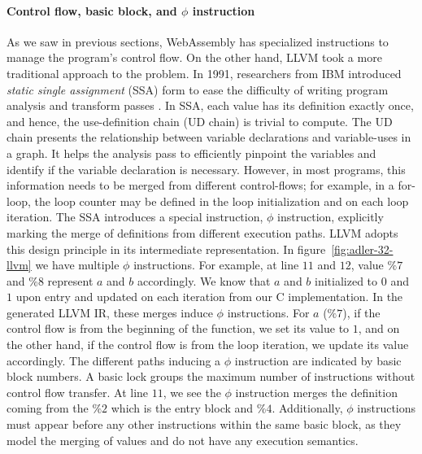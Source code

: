 \paragraph{Control flow, basic block, and $\phi$ instruction}
As we saw in previous sections, WebAssembly has specialized instructions to
manage the program's control flow. On the other hand, LLVM took a more
traditional approach to the problem. In 1991, researchers from IBM introduced
\emph{static single assignment} (SSA) form to ease the difficulty of writing
program analysis and transform passes \cite{ibm-ssa}. In SSA, each value has its
definition exactly once, and hence, the use-definition chain (UD chain) is
trivial to compute. The UD chain presents the relationship between variable
declarations and variable-uses in a graph. It helps the analysis pass to
efficiently pinpoint the variables and identify if the variable declaration is
necessary. However, in most programs, this information needs to be merged from
different control-flows; for example, in a for-loop, the loop counter may be
defined in the loop initialization and on each loop iteration. The SSA
introduces a special instruction, $\phi$ instruction, explicitly marking the
merge of definitions from different execution paths. LLVM adopts this design
principle in its intermediate representation. In figure~\ref{fig:adler-32-llvm}
we have multiple $\phi$ instructions. For example, at line $11$ and $12$, value
$\%7$ and $\%8$ represent $a$ and $b$ accordingly. We know that $a$ and $b$
initialized to $0$ and $1$ upon entry and updated on each iteration from our
C implementation. In the generated LLVM IR, these merges induce $\phi$
instructions. For $a$ ($\%7$), if the control flow is from the beginning of the
function, we set its value to $1$, and on the other hand, if the control flow
is from the loop iteration, we update its value accordingly. The different paths
inducing a $\phi$ instruction are indicated by basic block numbers. A basic
lock groups the maximum number of instructions without control flow transfer.
At line $11$, we see the $\phi$ instruction merges the definition coming from
the $\%2$ which is the entry block and $\%4$. Additionally, $\phi$ instructions
must appear before any other instructions within the same basic block, as they
model the merging of values and do not have any execution semantics.

